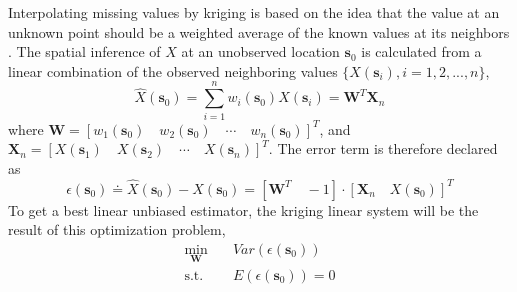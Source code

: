 \documentclass[english]{article}
\numberwithin{equation}{section}
\numberwithin{table}{section}
\numberwithin{figure}{section}
\newcommand{\bms}{\bm{s}}
\begin{document}
Interpolating missing values by kriging is based on the idea that the
value at an unknown point should be a weighted average of the known
values at its neighbors \cite{Cressie93}. 
The spatial inference of $X$ at an unobserved location $\bms_0$ is
calculated from a linear combination of the observed neighboring
values $\{X(\bms_i), i=1,2,...,n\}$,
\begin{equation} \label{nawls}
  \hat{X}(\bms_0) = \sum_{i=1}^n w_i(\bms_0)X(\bms_i) = \bm{W}^T\bm{X}_n
\end{equation}
where $\bm{W} = \left[ w_1(\bms_0) \quad w_2(\bms_0) \quad \cdots 
\quad w_n(\bms_0) \right]^T$, and 
$\bm{X}_n = \left[ X(\bms_1) \quad X(\bms_2) \quad \cdots
\quad X(\bms_n) \right]^T$. The error term is therefore declared as
\begin{equation} \label{errordef}
  \epsilon(\bms_0) \doteq \hat{X}(\bms_0) - X(\bms_0) 
  = \left[ \bm{W}^T \quad -1 \right] \cdot \left[ \bm{X}_n \quad X(\bms_0) \right]^T
\end{equation}
To get a best linear unbiased estimator, the kriging linear system
will be the result of this optimization problem,
\begin{equation} \label{krigsys}
\begin{split}
  \min_{\bm{W}} \quad & Var(\epsilon(\bms_0))\\
  \mbox{s.t.} \quad & E(\epsilon(\bms_0)) = 0
\end{split}
\end{equation}
\end{document}

